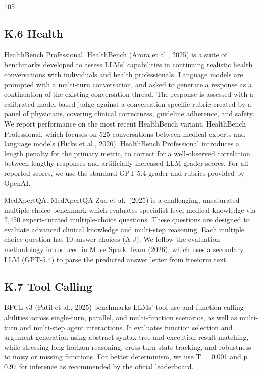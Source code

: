 \documentclass[
  10
]{article}
\begin{document}
105

\subsection{K.6 Health}\label{k.6-health}

HealthBench Professional. HealthBench (Arora et al., 2025) is a suite of
benchmarks developed to assess LLMs' capabilities in continuing
realistic health conversations with individuals and health
professionals. Language models are prompted with a multi-turn
conversation, and asked to generate a response as a continuation of the
existing conversation thread. The response is assessed with a calibrated
model-based judge against a conversation-specific rubric created by a
panel of physicians, covering clinical correctness, guideline adherence,
and safety. We report performance on the most recent HealthBench
variant, HealthBench Professional, which focuses on 525 conversations
between medical experts and language models (Hicks et al., 2026).
HealthBench Professional introduces a length penalty for the primary
metric, to correct for a well-observed correlation between lengthy
responses and artificially increased LLM-grader scores. For all reported
scores, we use the standard GPT-5.4 grader and rubrics provided by
OpenAI.

MedXpertQA. MedXpertQA Zuo et al.~(2025) is a challenging, unsaturated
multiple-choice benchmark which evaluates specialist-level medical
knowledge via 2,450 expert-curated multiple-choice questions. These
questions are designed to evaluate advanced clinical knowledge and
multi-step reasoning. Each multiple choice question has 10 answer
choices (A-J). We follow the evaluation methodology introduced in Muse
Spark Team (2026), which uses a secondary LLM (GPT-5.4) to parse the
predicted answer letter from freeform text.

\subsection{K.7 Tool Calling}\label{k.7-tool-calling}

BFCL v3 (Patil et al., 2025) benchmarks LLMs' tool-use and
function-calling abilities across single-turn, parallel, and
multi-function scenarios, as well as multi-turn and multi-step agent
interactions. It evaluates function selection and argument generation
using abstract syntax tree and execution result matching, while
stressing long-horizon reasoning, cross-turn state tracking, and
robustness to noisy or missing functions. For better determinism, we use
T = 0.001 and p = 0.97 for inference as recommended by the oficial
leaderboard.
\end{document}
